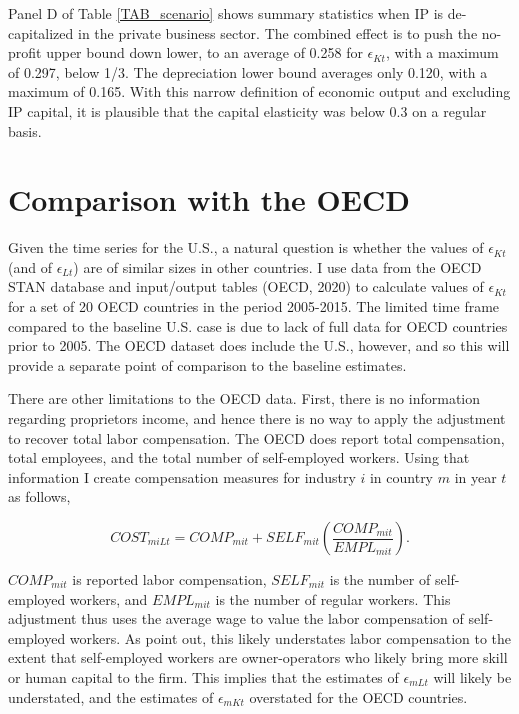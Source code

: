 \documentclass[11pt]{article}
\begin{document}
Panel D of Table \ref{TAB_scenario} shows summary statistics when IP is de-capitalized in the private business sector. The combined effect is to push the no-profit upper bound down lower, to an average of 0.258 for $\epsilon_{Kt}$, with a maximum of 0.297, below 1/3. The depreciation lower bound averages only 0.120, with a maximum of 0.165. With this narrow definition of economic output and excluding IP capital, it is plausible that the capital elasticity was below 0.3 on a regular basis.

\section{Comparison with the OECD}
Given the time series for the U.S., a natural question is whether the values of $\epsilon_{Kt}$ (and of $\epsilon_{Lt}$) are of similar sizes in other countries. I use data from the OECD STAN database \citep{stan} and input/output tables (OECD, 2020) \nocite{oecdio} to calculate values of $\epsilon_{Kt}$ for a set of 20 OECD countries in the period 2005-2015. The limited time frame compared to the baseline U.S. case is due to lack of full data for OECD countries prior to 2005. The OECD dataset does include the U.S., however, and so this will provide a separate point of comparison to the baseline estimates.

There are other limitations to the OECD data. First, there is no information regarding proprietors income, and hence there is no way to apply the \cite{gommerupert2004} adjustment to recover total labor compensation. The OECD does report total compensation, total employees, and the total number of self-employed workers. Using that information I create compensation measures for industry $i$ in country $m$ in year $t$ as follows,

\begin{equation}
	COST_{miLt} = COMP_{mit} + SELF_{mit} \left(\frac{COMP_{mit}}{EMPL_{mit}}\right).
\end{equation}

$COMP_{mit}$ is reported labor compensation, $SELF_{mit}$ is the number of self-employed workers, and $EMPL_{mit}$ is the number of regular workers. This adjustment thus uses the average wage to value the labor compensation of self-employed workers. As \cite{gommerupert2004} point out, this likely understates labor compensation to the extent that self-employed workers are owner-operators who likely bring more skill or human capital to the firm. This implies that the estimates of $\epsilon_{mLt}$ will likely be understated, and the estimates of $\epsilon_{mKt}$ overstated for the OECD countries.
\end{document}
